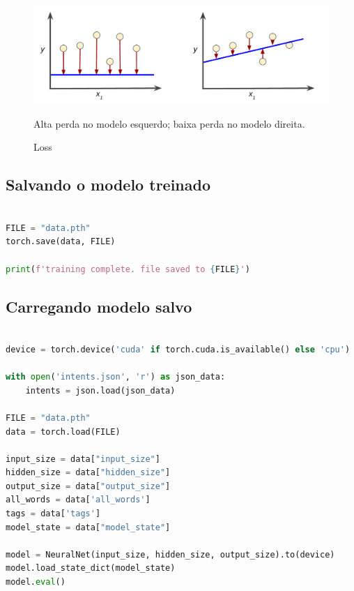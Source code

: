\begin{figure}[H]
   \begin{center}
      \includegraphics[width=13cm]{img/Loss.png}
      \caption{Loss} \label{loss}
      \medskip
      \small
      Alta perda no modelo esquerdo; baixa perda no modelo direita.
   \end{center}
\end{figure}


\subsection[Salvando o modelo treinado]{Salvando o modelo treinado}

\begin{lstlisting}[language=Python, caption=Salvando o modelo treinado]

FILE = "data.pth"
torch.save(data, FILE)

print(f'training complete. file saved to {FILE}')

\end{lstlisting}

\subsection[Carregando nosso modelo salvo]{Carregando modelo salvo}

\begin{lstlisting}[language=Python, caption=Carregando modelo salvo]

device = torch.device('cuda' if torch.cuda.is_available() else 'cpu')

with open('intents.json', 'r') as json_data:
    intents = json.load(json_data)

FILE = "data.pth"
data = torch.load(FILE)

input_size = data["input_size"]
hidden_size = data["hidden_size"]
output_size = data["output_size"]
all_words = data['all_words']
tags = data['tags']
model_state = data["model_state"]

model = NeuralNet(input_size, hidden_size, output_size).to(device)
model.load_state_dict(model_state)
model.eval()

\end{lstlisting}

